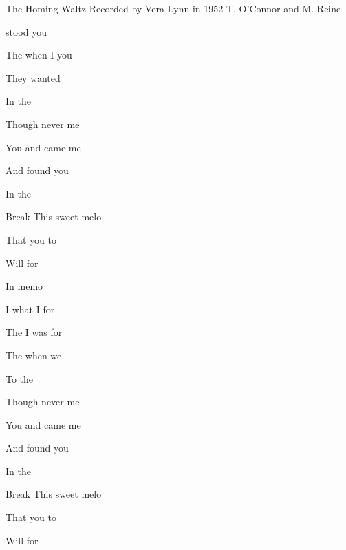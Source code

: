 \begin{SBSong}{The Homing Waltz}
  {Recorded by Vera Lynn in 1952}
  {T. O'Connor and M. Reine}
  \begin{SBVerse}
	  stood  you
	
	The  when I  you
	
	They  wanted 
	
	In the   
  \end{SBVerse}
  \begin{SBVerse}
	Though  never  me
	
	You  and came  me
	
	And  found you 
	
	In the  
  \end{SBVerse}
  \begin{SBBracket}{Break}
	This sweet melo

	That  you to 

	Will  for 

	In  memo
  \end{SBBracket}
  \begin{SBVerse}
	I  what I  for
	
	The  I was  for
	
	The  when we 
	
	To the   
  \end{SBVerse}
  \begin{SBVerse}
	Though  never  me
	
	You  and came  me
	
	And  found you 
	
	In the  
  \end{SBVerse}
  \CBPageBrk
  \begin{SBBracket}{Break}
	This sweet melo

	That  you to 

	Will  for 


\end{SBBracket}
\end{SBSong}
